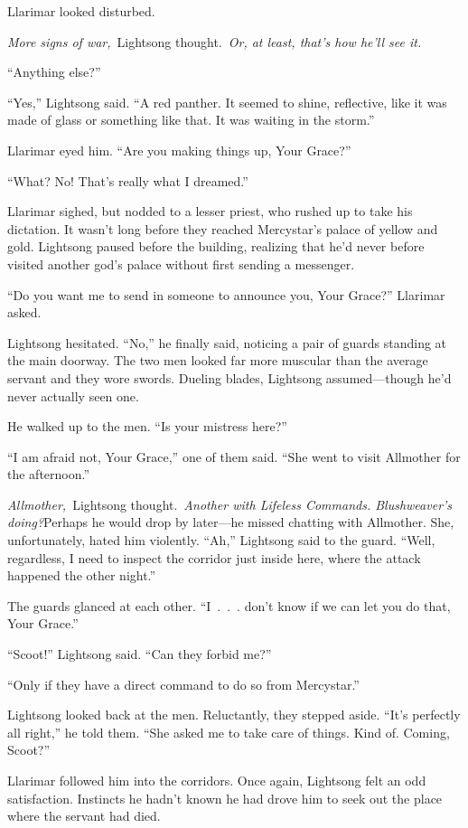 Llarimar looked disturbed.

\textit{More signs of war,}~Lightsong thought.~\textit{Or, at least, that’s how he’ll see it.}

“Anything else?”

“Yes,” Lightsong said. “A red panther. It seemed to shine, reflective, like it was made of glass or something like that. It was waiting in the storm.”

Llarimar eyed him. “Are you making things up, Your Grace?”

“What? No! That’s really what I dreamed.”

Llarimar sighed, but nodded to a lesser priest, who rushed up to take his dictation. It wasn’t long before they reached Mercystar’s palace of yellow and gold. Lightsong paused before the building, realizing that he’d never before visited another god’s palace without first sending a messenger.

“Do you want me to send in someone to announce you, Your Grace?” Llarimar asked.

Lightsong hesitated. “No,” he finally said, noticing a pair of guards standing at the main doorway. The two men looked far more muscular than the average servant and they wore swords. Dueling blades, Lightsong assumed—though he’d never actually seen one.

He walked up to the men. “Is your mistress here?”

“I am afraid not, Your Grace,” one of them said. “She went to visit Allmother for the afternoon.”

\textit{Allmother,}~Lightsong thought.~\textit{Another with Lifeless Commands. Blushweaver’s doing?}Perhaps he would drop by later—he missed chatting with Allmother. She, unfortunately, hated him violently. “Ah,” Lightsong said to the guard. “Well, regardless, I need to inspect the corridor just inside here, where the attack happened the other night.”

The guards glanced at each other. “I~.~.~. don’t know if we can let you do that, Your Grace.”

“Scoot!” Lightsong said. “Can they forbid me?”

“Only if they have a direct command to do so from Mercystar.”

Lightsong looked back at the men. Reluctantly, they stepped aside. “It’s perfectly all right,” he told them. “She asked me to take care of things. Kind of. Coming, Scoot?”

Llarimar followed him into the corridors. Once again, Lightsong felt an odd satisfaction. Instincts he hadn’t known he had drove him to seek out the place where the servant had died.

